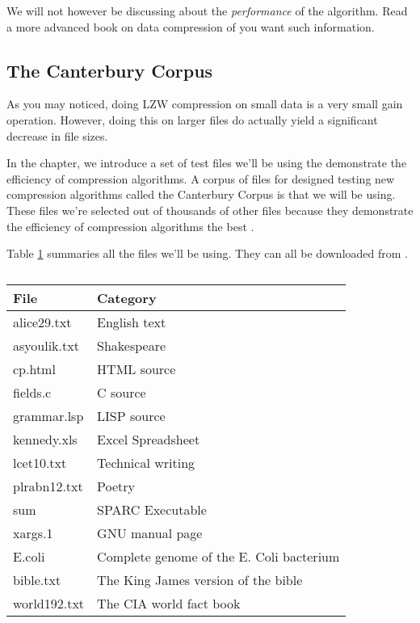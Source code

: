 \begin{refsection}
We will not however be discussing about the \textit{performance} of
the algorithm. Read a more advanced book on data compression of you
want such information.

\subsection{The Canterbury Corpus}

As you may noticed, doing LZW compression on small data is a very small
gain operation. However, doing this on larger files do actually yield a
significant decrease in file sizes.

In the chapter, we introduce a set of test files we'll be using the
demonstrate the efficiency of compression algorithms. A corpus of
files for designed testing new compression algorithms called the
Canterbury Corpus is that we will be using. These files we're selected
out of thousands of other files because they demonstrate the
efficiency of compression algorithms the best \cite{arnold:corpus}.

Table \ref{tab:corp-files} summaries all the files we'll be using. They can all be
downloaded from \cite{powell:desc-corp}.

\begin{table}
  \centering
  \begin{tabular}{ll}
    \toprule
    File & Category \\
    \midrule
    alice29.txt & English text \\
    asyoulik.txt & Shakespeare \\
    cp.html & HTML source \\
    fields.c & C source \\
    grammar.lsp & LISP source \\
    kennedy.xls & Excel Spreadsheet \\
    lcet10.txt & Technical writing \\
    plrabn12.txt & Poetry \\
    sum & SPARC Executable \\
    xargs.1 & GNU manual page \\
    E.coli & Complete genome of the E. Coli bacterium \\
    bible.txt & The King James version of the bible \\
    world192.txt & The CIA world fact book \\
    \bottomrule
  \end{tabular}
  \caption{}
  \label{tab:corp-files}
\end{table}


\end{refsection}
